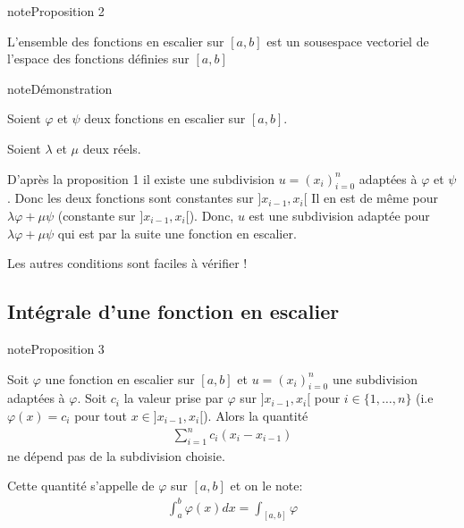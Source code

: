 \documentclass[letterpaper,10pt,french]{sphinxmanual}
\begin{document}
\begin{sphinxadmonition}{note}{Proposition 2}

\sphinxAtStartPar
L’ensemble des fonctions en escalier sur \([a, b]\) est un sous\sphinxhyphen{}espace vectoriel de l’espace des fonctions définies sur \([a, b]\)
\end{sphinxadmonition}

\begin{sphinxadmonition}{note}{Démonstration}

\sphinxAtStartPar
Soient \(\varphi\) et \(\psi\) deux fonctions en escalier sur \([a, b]\).

\sphinxAtStartPar
Soient \(\lambda\) et \(\mu\) deux réels.

\sphinxAtStartPar
D’après la proposition 1 il existe une subdivision \(u=(x_i)_{i=0}^n\) adaptées à \(\varphi\) et \(\psi\).
Donc les deux fonctions sont constantes sur \(]x_{i-1}, x_{i}[\)
Il en est de même pour \(\lambda \varphi + \mu \psi\) (constante sur \(]x_{i-1}, x_{i}[\)).
Donc, \(u\) est une subdivision adaptée pour \(\lambda \varphi + \mu \psi\) qui est par la suite une fonction en escalier.

\sphinxAtStartPar
Les autres conditions sont faciles à vérifier !
\end{sphinxadmonition}


\subsection{Intégrale d’une fonction en escalier}
\label{\detokenize{fe:integrale-d-une-fonction-en-escalier}}
\begin{sphinxadmonition}{note}{Proposition 3}

\sphinxAtStartPar
Soit \(\varphi\) une fonction en escalier sur \([a, b]\) et \(u=(x_i)_{i=0}^n\) une subdivision  adaptées à \(\varphi\). Soit \(c_i\) la valeur prise par \(\varphi\) sur \(]x_{i-1}, x_i[\) pour \(i \in \{1, \ldots, n\}\) (i.e \(\varphi(x)=c_i\) pour tout \(x \in ]x_{i-1}, x_i[\)). Alors la quantité
\begin{equation*}
\begin{split}
\sum_{i=1}^nc_i(x_i-x_{i-1})
\end{split}
\end{equation*}
\sphinxAtStartPar
ne dépend pas de la subdivision choisie.

\sphinxAtStartPar
Cette quantité s’appelle  de \(\varphi\) sur  \([a, b]\) et on le note:
\begin{equation*}
\begin{split}
\int_a^b \varphi(x)dx=\int_{[a, b]}\varphi
\end{split}
\end{equation*}\end{sphinxadmonition}
\end{document}
